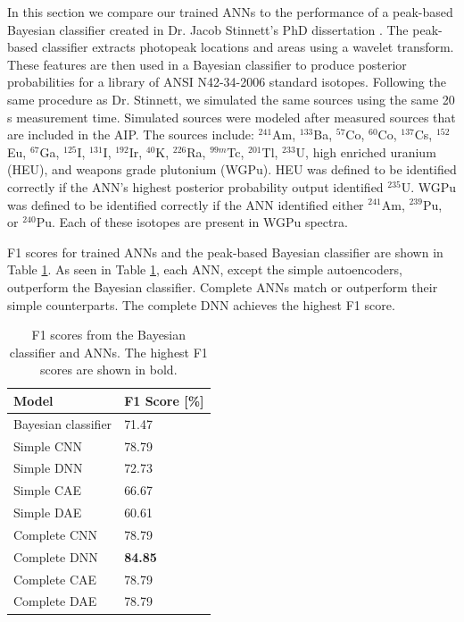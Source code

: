 In this section we compare our trained ANNs to the performance of a peak-based Bayesian classifier created in Dr. Jacob Stinnett's PhD dissertation \cite{stinnett2016}. The peak-based classifier extracts photopeak locations and areas using a wavelet transform. These features are then used in a Bayesian classifier to produce posterior probabilities for a library of ANSI N42-34-2006 standard isotopes. Following the same procedure as Dr. Stinnett, we simulated the same sources using the same 20 s measurement time. Simulated sources were modeled after measured sources that are included in the AIP. The sources include: $^{241}$Am, $^{133}$Ba, $^{57}$Co, $^{60}$Co, $^{137}$Cs, $^{152}$Eu, $^{67}$Ga, $^{125}$I, $^{131}$I, $^{192}$Ir, $^{40}$K, $^{226}$Ra, $^{99m}$Tc, $^{201}$Tl, $^{233}$U, high enriched uranium (HEU), and weapons grade plutonium (WGPu). HEU was defined to be identified correctly if the ANN's highest posterior probability output identified $^{235}$U. WGPu was defined to be identified correctly if the ANN identified either $^{241}$Am, $^{239}$Pu, or $^{240}$Pu. Each of these isotopes are present in WGPu spectra.

F1 scores for trained ANNs and the peak-based Bayesian classifier are shown in Table \ref{table:jacob_compare}. As seen in Table \ref{table:jacob_compare}, each ANN, except the simple autoencoders, outperform the Bayesian classifier. Complete ANNs match or outperform their simple counterparts. The complete DNN achieves the highest F1 score. 

\begin{table}[H]
	\centering
	\caption{F1 scores from the Bayesian classifier and ANNs. The highest F1 scores are shown in bold.}
	\label{table:jacob_compare}
	\begin{tabular}{ll}
		\hline
		\textbf{Model} &  \textbf{F1 Score [\%]} \\ \hline
		Bayesian classifier & 71.47 \\ 
		Simple CNN & 78.79 \\ 
		Simple DNN & 72.73 \\ 
		Simple CAE & 66.67 \\ 		
		Simple DAE & 60.61 \\ 
		Complete CNN & 78.79 \\ 
		Complete DNN & \textbf{84.85} \\ 
		Complete CAE & 78.79 \\ 
		Complete DAE & 78.79 \\ \hline
	\end{tabular}
\end{table}

